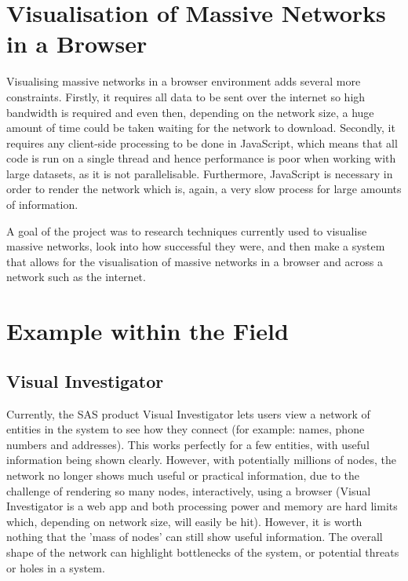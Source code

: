 \documentclass[../dissertation.tex]{subfiles}
\begin{document}
\section{Visualisation of Massive Networks in a Browser}

Visualising massive networks in a browser environment adds several more constraints. Firstly, it requires all data to be sent over the internet so high bandwidth is required and even then, depending on the network size, a huge amount of time could be taken waiting for the network to download. Secondly, it requires any client-side processing to be done in JavaScript, which means that all code is run on a single thread \cite{herhut2012parallel} and hence performance is poor when working with large datasets, as it is not parallelisable. Furthermore, JavaScript is necessary in order to render the network which is, again, a very slow process for large amounts of information. 

A goal of the project was to research techniques currently used to visualise massive networks, look into how successful they were, and then make a system that allows for the visualisation of massive networks in a browser and across a network such as the internet. 

\section{Example within the Field}

\subsection{Visual Investigator}

Currently, the SAS product Visual Investigator \cite{sasvi} lets users view a network of entities in the system to see how they connect (for example: names, phone numbers and addresses). This works perfectly for a few entities, with useful information being shown clearly. However, with potentially millions of nodes, the network no longer shows much useful or practical information, due to the challenge of rendering so many nodes, interactively, using a browser (Visual Investigator is a web app and both processing power and memory are hard limits which, depending on network size, will easily be hit). However, it is worth nothing that the 'mass of nodes' can still show useful information. The overall shape of the network can highlight bottlenecks of the system, or potential threats or holes in a system.
\end{document}
